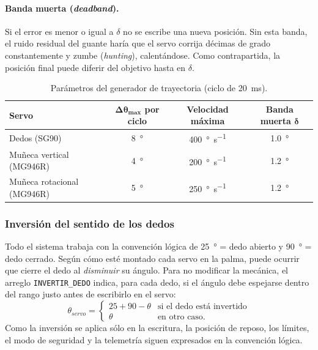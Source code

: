 \paragraph{Banda muerta (\textit{deadband}).} Si el error es menor o igual a $\delta$ no se escribe una nueva posición. Sin esta banda, el ruido residual del guante haría que el servo corrija décimas de grado constantemente y zumbe (\textit{hunting}), calentándose. Como contrapartida, la posición final puede diferir del objetivo hasta en $\delta$.

\begin{table}[H]
\centering
\begin{tabular}{l c c c}
\toprule
\textbf{Servo} & $\boldsymbol{\Delta\theta_{\max}}$ \textbf{por ciclo} & \textbf{Velocidad máxima} & \textbf{Banda muerta} $\boldsymbol{\delta}$ \\
\midrule
Dedos (SG90)              & \SI{8}{\degree} & \SI{400}{\degree\per\second} & \SI{1.0}{\degree} \\
Muñeca vertical (MG946R)  & \SI{4}{\degree} & \SI{200}{\degree\per\second} & \SI{1.2}{\degree} \\
Muñeca rotacional (MG946R)& \SI{5}{\degree} & \SI{250}{\degree\per\second} & \SI{1.2}{\degree} \\
\bottomrule
\end{tabular}
\caption{Parámetros del generador de trayectoria (ciclo de \SI{20}{\milli\second}).}
\label{tab:param_rx}
\end{table}

\subsubsection{Inversión del sentido de los dedos}

Todo el sistema trabaja con la convención lógica de \SI{25}{\degree} = dedo abierto y \SI{90}{\degree} = dedo cerrado. Según cómo esté montado cada servo en la palma, puede ocurrir que cierre el dedo al \emph{disminuir} su ángulo. Para no modificar la mecánica, el arreglo \texttt{INVERTIR\_DEDO} indica, para cada dedo, si el ángulo debe espejarse dentro del rango justo antes de escribirlo en el servo:
\begin{equation}
\theta_{servo} =
\begin{cases}
25 + 90 - \theta & \text{si el dedo está invertido} \\
\theta & \text{en otro caso.}
\end{cases}
\end{equation}
Como la inversión se aplica sólo en la escritura, la posición de reposo, los límites, el modo de seguridad y la telemetría siguen expresados en la convención lógica.

